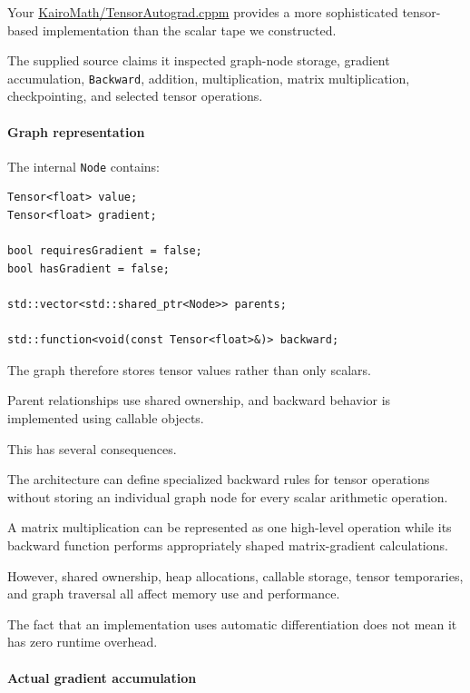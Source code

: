 Your \href{https://github.com/swayam8624/KairoMath/blob/master/TensorAutograd.cppm?utm_source=chatgpt.com}{KairoMath/TensorAutograd.cppm} provides a more sophisticated tensor-based implementation than the scalar tape we constructed.

The supplied source claims it inspected graph-node storage, gradient accumulation, \texttt{Backward}, addition, multiplication, matrix multiplication, checkpointing, and selected tensor operations.

\paragraph{Graph representation}\label{02-foundations-ii-ch022-graph-representation}

The internal \texttt{Node} contains:

\begin{verbatim}
Tensor<float> value;
Tensor<float> gradient;

bool requiresGradient = false;
bool hasGradient = false;

std::vector<std::shared_ptr<Node>> parents;

std::function<void(const Tensor<float>&)> backward;
\end{verbatim}

The graph therefore stores tensor values rather than only scalars.

Parent relationships use shared ownership, and backward behavior is implemented using callable objects.

This has several consequences.

The architecture can define specialized backward rules for tensor operations without storing an individual graph node for every scalar arithmetic operation.

A matrix multiplication can be represented as one high-level operation while its backward function performs appropriately shaped matrix-gradient calculations.

However, shared ownership, heap allocations, callable storage, tensor temporaries, and graph traversal all affect memory use and performance.

The fact that an implementation uses automatic differentiation does not mean it has zero runtime overhead.

\paragraph{Actual gradient accumulation}\label{02-foundations-ii-ch022-actual-gradient-accumulation}

